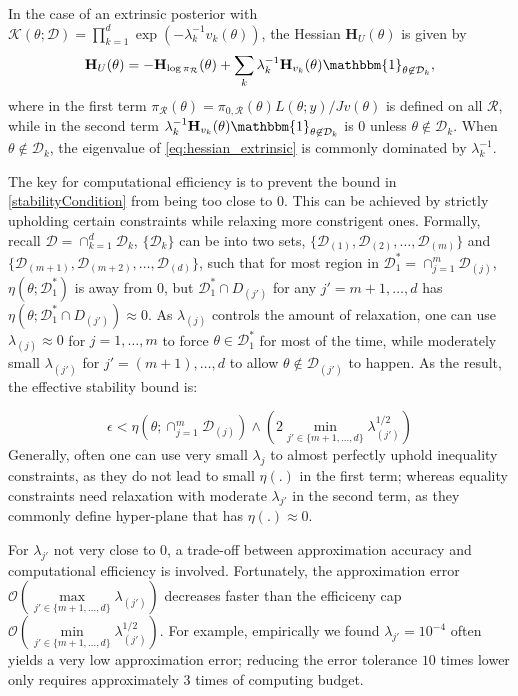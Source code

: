 \documentclass[10pt]{article}
\newcommand{\mc}[1]{\mathcal{#1}}
\DeclareMathOperator{\1}{\mathbbm{1}}
\newcommand{\dt}{\epsilon} %
\newcommand{\hess}{\mathbf{H}} %
\begin{document}
In the case of an extrinsic posterior with $\mc K(\theta;\mc D)= \prod_{k=1}^{d} \exp(- \lambda_k^{-1}v_k(\theta))$, the Hessian $\hess_U(\theta)$ is given by
\begin{equation}
\label{eq:hessian_extrinsic}
\hess_U(\theta) = -\hess_{\log \pi_\mc R}(\theta)+\sum_k \lambda_k^{-1} \hess_{v_k}(\theta) \mathbbm{1}_{\theta\not\in \mc D_k},
\end{equation}
where in the first term $\pi_\mc R(\theta)=\pi_{0,\mc R}(\theta)L(\theta;y)/Jv(\theta)$ is defined on all $\mc R$, while in the second term $\lambda_k^{-1} \hess_{v_k}(\theta) \mathbbm{1}_{\theta\not\in \mc D_k}$ is $0$ unless $\theta\not\in \mc D_k$.  When $\theta\not\in \mc D_k$, the eigenvalue of \eqref{eq:hessian_extrinsic} is commonly dominated by $\lambda^{-1}_k$.

The key for computational efficiency is to prevent the bound in \eqref{stabilityCondition} from being too close to $0$. This can be achieved by strictly upholding certain constraints while relaxing more constrigent ones. Formally, recall $\mc D=\cap_{k=1}^d \mc D_k$, $\{\mc D_k\}$ can be into two sets, $\{\mc D_{(1)}, \mc D_{(2)}, \ldots , \mc D_{(m)} \}$ and $\{\mc D_{(m+1)}, \mc D_{(m+2)}, \ldots , \mc D_{(d)} \}$, such that  for most region in $\mc D^*_1= \cap_{j=1}^m \mc D_{(j)}$, $\eta(\theta;{\mc D^*_1})$ is away from $0$, but $\mc D^*_1 \cap D_{(j')}$ for any $j'= m+1, \ldots, d$ has $\eta(\theta; \mc D^*_1 \cap D_{(j')})\approx 0$. As $\lambda_{(j)}$ controls the amount of relaxation, one can use $\lambda_{(j)}\approx 0$ for $j=1,\ldots,m$ to force $\theta \in \mc D_1^*$ for most of the time, while moderately small $\lambda_{(j')}$ for $j'=(m+1),\ldots,d$ to allow $\theta\not \in \mc D_{(j')}$ to happen. As the result, the effective stability bound is:


\begin{equation}
\label{optimalStabilityCondition}
\dt <  \eta(\theta;{\cap_{j=1}^m \mc D_{(j)}})  \wedge \left(2 \min_{j'\in \{m+1,\ldots,d\}}\lambda_{(j')}^{1/2}\right)
\end{equation}
Generally, often one can use very small $\lambda_j$ to almost perfectly uphold inequality constraints, as they do not lead to small $\eta(.)$ in the first term; whereas equality constraints need relaxation with moderate $\lambda_{j'}$ in the second term, as they commonly define hyper-plane that has $\eta(.)\approx 0$.

For $\lambda_{j'}$ not very close to $0$, a trade-off between approximation accuracy and computational efficiency is involved. Fortunately,  the approximation error $\mc O( \underset{j'\in \{m+1,\ldots,d\}} \max\lambda_{(j')})$ decreases faster than the efficiceny cap $\mc O( \underset{j'\in \{m+1,\ldots,d\}} \min\lambda^{1/2}_{(j')})$. For example, empirically we found $\lambda_{j'}=10^{-4}$ often yields a very low approximation error; reducing the error tolerance $10$ times 
lower only requires approximately $3$ times of computing budget.
\end{document}
